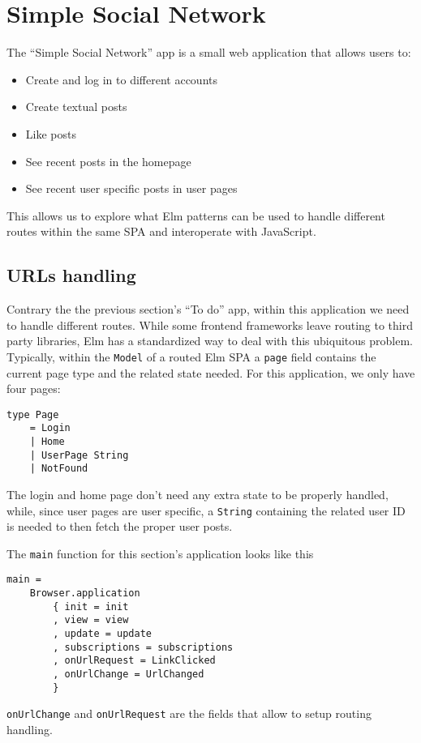 \section{Simple Social Network}
The ``Simple Social Network'' app is a small web application that allows users to:
\begin{itemize}
    \item Create and log in to different accounts
    \item Create textual posts
    \item Like posts
    \item See recent posts in the homepage
    \item See recent user specific posts in user pages
\end{itemize}
This allows us to explore what Elm patterns can be used to handle different routes within the same SPA and interoperate with JavaScript.

\subsection{URLs handling}
Contrary the the previous section's ``To do'' app, within this application we need to handle different routes. While some frontend frameworks leave routing to third party libraries, Elm has a standardized way to deal with this ubiquitous problem.\\

Typically, within the \texttt{Model} of a routed Elm SPA a \texttt{page} field contains the current page type and the related state needed. For this application, we only have four pages:
\begin{verbatim}
type Page
    = Login
    | Home
    | UserPage String
    | NotFound
\end{verbatim}
The login and home page don't need any extra state to be properly handled, while, since user pages are user specific, a \texttt{String} containing the related user ID is needed to then fetch the proper user posts.

The \texttt{main} function for this section's application looks like this

\begin{verbatim}
main =
    Browser.application
        { init = init
        , view = view
        , update = update
        , subscriptions = subscriptions
        , onUrlRequest = LinkClicked
        , onUrlChange = UrlChanged
        }
\end{verbatim}

\texttt{onUrlChange} and \texttt{onUrlRequest} are the fields that allow to setup routing handling.\\

